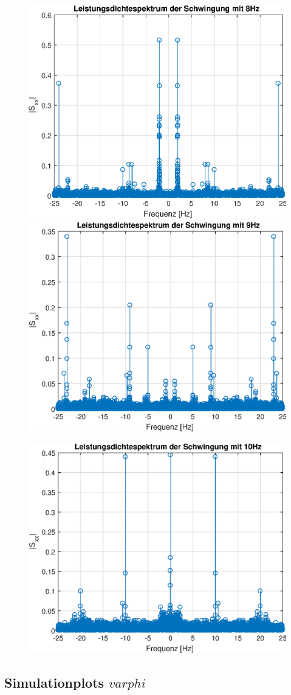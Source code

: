 \documentclass{article}
\begin{document}
\begin{figure}[!h]
\includegraphics[width=0.5\linewidth]{img/lds_sinefreq_8}
\includegraphics[width=0.5\linewidth]{img/lds_sinefreq_9}
\end{figure}
\begin{figure}[!h]
\centering
\includegraphics[width=0.5\linewidth]{img/lds_sinefreq_10}
\end{figure}


\newpage
\subsection{Simulationplots $varphi$}
\end{document}
